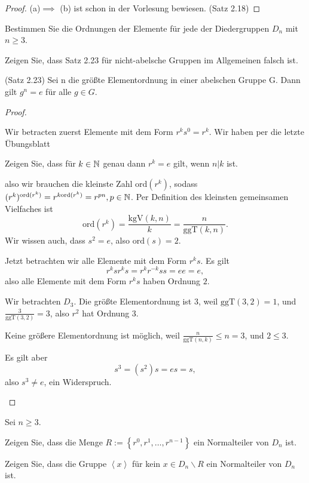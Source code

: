 \begin{proof}
	(a)$\implies$ (b) ist schon in der Vorlesung bewiesen. (Satz 2.18)
\end{proof}
\begin{Problem}
	\begin{parts}
	\item  Bestimmen Sie die Ordnungen der Elemente für jede der Diedergruppen $D_n$ mit $n\ge 3$.
	\item  Zeigen Sie, dass Satz 2.23 für nicht-abelsche Gruppen im Allgemeinen falsch ist.
		\begin{tcolorbox}
			(Satz 2.23) Sei n die größte Elementordnung in einer abelschen Gruppe G. Dann gilt $g^n = e$ für alle $g \in G$.
		\end{tcolorbox}
	\end{parts}
\end{Problem}
\begin{proof}
	\begin{parts}
	\item Wir betracten zuerst Elemente mit dem Form $r^ks^0=r^k$. Wir haben per die letzte Übungsblatt
		\begin{tcolorbox}
			Zeigen Sie, dass für $k \in \mathbb{N}$ genau dann $r^k = e$ gilt, wenn $n|k$ ist.
		\end{tcolorbox}
		also wir brauchen die kleinste Zahl $\text{ord}(r^k)$, sodass $(r^k)^{\text{ord}(r^k)}=r^{k\text{ord}(r^k)}=r^{pn},p\in \mathbb{N}$. Per Definition des kleinsten gemeinsamen Vielfaches ist
		\[
			\text{ord}(r^k)=\frac{\text{kgV}(k, n)}{k}=\frac{n}{\text{ggT}(k,n)}
		.\] 
		Wir wissen auch, dass $s^2=e$, also $\text{ord}(s)=2$.
		
		Jetzt betrachten wir alle Elemente mit dem Form $r^ks$. Es gilt
		\[
			r^ks r^k s=r^kr^{-k}s s=ee=e
		,\]
		also alle Elemente mit dem Form $r^ks$ haben Ordnung $2$.
	\item Wir betrachten $D_3$. Die größte Elementordnung ist $3$, weil $\text{ggT}(3,2)=1$, und $\frac{3}{\text{ggT}(3,2)}=3$, also $r^2$ hat Ordnung $3$.

		Keine größere Elementordnung ist möglich, weil $\frac{n}{\text{ggT}(n,k)}\le n=3$, und $2 \le 3$. 

		Es gilt aber
		\[
		s^3=(s^2)s=es=s
		,\]
		also $s^3\neq e$, ein Widerspruch.\qedhere
	\end{parts}
\end{proof}
\begin{Problem}
	Sei $n\ge 3$. 
	\begin{parts}
	\item Zeigen Sie, dass die Menge $R:=\left\{ r^0, r^1, \dots, r^{n-1} \right\} $ ein Normalteiler von $D_n$ ist.
	\item Zeigen Sie, dass die Gruppe $\left<x \right>$ f\"{u}r kein $x\in D_n\backslash R$ ein Normalteiler von $D_n$ ist.
	\end{parts}
\end{Problem}
